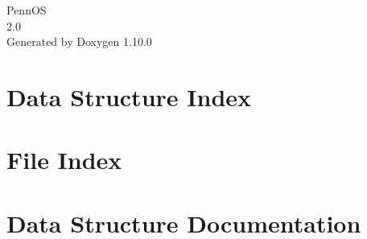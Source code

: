 \documentclass[twoside]{book}
\newcommand{\+}{\discretionary{\mbox{\scriptsize$\hookleftarrow$}}{}{}}
\newcommand{\clearemptydoublepage}{%
    \newpage{\pagestyle{empty}\cleardoublepage}%
  }
\begin{document}
  \raggedbottom
    \hypersetup{pageanchor=false,
                bookmarksnumbered=true,
                pdfencoding=unicode
               }
  \begin{titlepage}
  \vspace*{7cm}
  \begin{center}%
  {\Large Penn\+OS}\\
  [1ex]\large 2.\+0 \\
  \vspace*{1cm}
  {\large Generated by Doxygen 1.10.0}\\
  \end{center}
  \end{titlepage}
  \clearemptydoublepage
  \tableofcontents
  \clearemptydoublepage
  \hypersetup{pageanchor=true}






\chapter{Data Structure Index}

\chapter{File Index}

\chapter{Data Structure Documentation}














\end{document}
